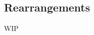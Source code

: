 \documentclass[../poma-notes.tex]{subfiles}
\begin{document}
\subsection*{Rearrangements}

WIP
\end{document}
